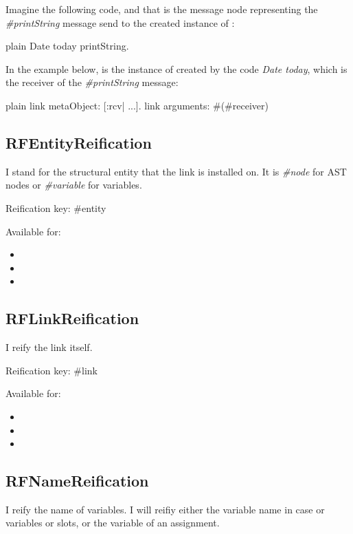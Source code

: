 \documentclass[10pt,twoside,english]{_support/latex/sbabook/sbabook}
\begin{document}
Imagine the following code, and that  is the message node representing the \textit{\#printString} message send to the created instance of :  

\begin{displaycode}{plain}
Date today printString.
\end{displaycode}

In the example below,  is the instance of  created by the code \textit{Date today}, which is the receiver of the \textit{\#printString} message:

\begin{displaycode}{plain}
link metaObject: [:rcv| ...].
link arguments: #(#receiver)
\end{displaycode}
\subsection{RFEntityReification}
I stand for the structural entity that the link is installed on. It is \textit{\#node} for AST nodes or \textit{\#variable} for variables.

Reification key: \#entity

Available for:

\begin{itemize}
\item {}
\item {}
\item {}
\end{itemize}
\subsection{RFLinkReification}
I reify the link itself. 

Reification key: \#link

Available for:

\begin{itemize}
\item {}
\item {}
\item {}
\end{itemize}
\subsection{RFNameReification}
I reify the name of variables. I will reifiy either the variable name in case or variables or slots, or the variable of an assignment. 
\end{document}
